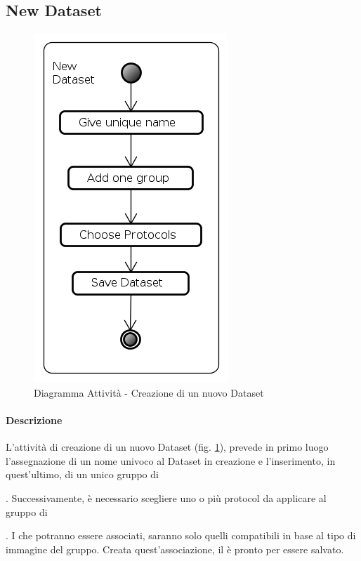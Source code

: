 \subsection{New Dataset}
\label{newDataset}
\begin{figure}[!h]
\centering
\includegraphics[width=0.4\linewidth]{./Content/Immagini/New_Dataset}
\caption{Diagramma Attività - Creazione di un nuovo Dataset}
\label{newData}
\end{figure}
\paragraph{Descrizione\\}
L'attività di creazione di un nuovo Dataset\glossario{} (fig. \ref{newData}), prevede in primo luogo l'assegnazione di un nome univoco al Dataset\glossario{} in creazione e l'inserimento, in quest'ultimo, di un unico gruppo di \subject{}. Successivamente, è necessario scegliere uno o più protocol\glossario{} da applicare al gruppo di \subject{}. I \protocol{} che potranno essere associati, saranno solo quelli compatibili in base al tipo di immagine del gruppo. Creata quest'associazione, il \dataset{} è pronto per essere salvato.
\pagebreak

